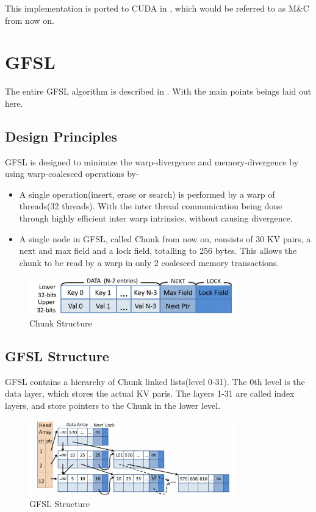 \documentclass[12pt,a4paper]{article}
\begin{document}
This implementation is ported to CUDA in \citep{mnc}, which would be referred to as M\&C from now on.

\section{GFSL}
The entire GFSL algorithm is described in \citep{gfsl}. With the main points beings laid out here.

\subsection{Design Principles}
GFSL is designed to minimize the warp-divergence and memory-divergence by using warp-coalesced operations by-

\begin{itemize}
    \item A single operation(insert, erase or search) is performed by a warp of threads(32 threads). With the inter thread communication being done through highly efficient inter warp intrinsics, without causing divergence.
    \item A single node in GFSL, called Chunk from now on, consists of 30 KV pairs, a next and max field and a lock field, totalling to 256 bytes. This allows the chunk to be read by a warp in only 2 coalesced memory transactions.
\end{itemize}

\begin{figure}[H]
    \centering
    \includegraphics[width=0.8\textwidth]{2.png}
    \caption{Chunk Structure}
\end{figure}

\subsection{GFSL Structure}
GFSL contains a hierarchy of Chunk linked lists(level 0-31). The 0th level is the data layer, which stores the actual KV paris. The layers 1-31 are called index layers, and store pointers to the Chunk in the lower level.

\begin{figure}[H]
    \centering
    \includegraphics[width=0.8\textwidth]{3.png}
    \caption{GFSL Structure}
\end{figure}
\end{document}
